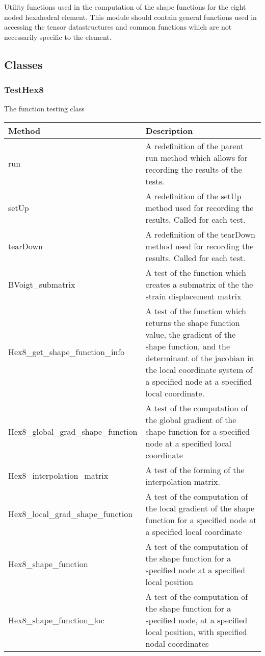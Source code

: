 \documentclass{asme2ej}
\begin{document}
Utility functions used in the computation of the shape functions for the eight noded hexahedral element. This module should contain general functions used in accessing the tensor datastructures and common functions which are not necessarily specific to the element.

\subsection{Classes}

\subsubsection{TestHex8}

The function testing class

\begin{longtable}{ p{}  p{} }
\hline
Method & Description\\
\hline
\hline
run & A redefinition of the parent run method which allows for recording the results of the tests.\\
setUp & A redefinition of the setUp method used for recording the results. Called for each test.\\
tearDown & A redefinition of the tearDown method used for recording the results. Called for each test.\\
BVoigt\_submatrix & A test of the function which creates a submatrix of the the strain displacement matrix\\
Hex8\_get\_shape\_function\_info & A test of the function which returns the shape function value, the gradient of the shape function, and the determinant of the jacobian in the local coordinate system of a specified node at a specified local coordinate.\\
Hex8\_global\_grad\_shape\_function & A test of the computation of the global gradient of the shape function for a specified node at a specified local coordinate\\
Hex8\_interpolation\_matrix & A test of the forming of the interpolation matrix.\\
Hex8\_local\_grad\_shape\_function & A test of the computation of the local gradient of the shape function for a specified node at a specified local coordinate\\
Hex8\_shape\_function & A test of the computation of the shape function for a specified node at a specified local position\\
Hex8\_shape\_function\_loc & A test of the computation of the shape function for a specified node, at a specified local position, with specified nodal coordinates\\

\end{longtable}
\end{document}
